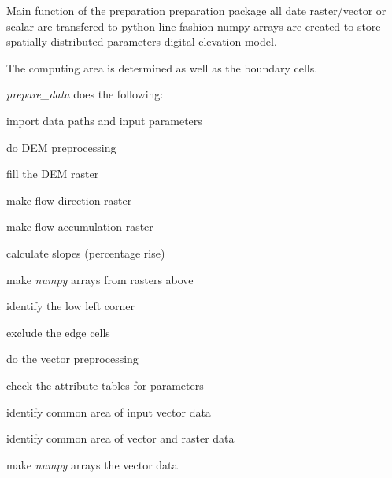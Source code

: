 Main function of the preparation preparation package all date raster/vector or scalar are transfered to python line fashion numpy arrays are created to store spatially distributed parameters digital elevation model. 

The computing area is determined as well as the boundary cells.

{\itshape prepare\-\_\-data} does the following\-:
\begin{DoxyItemize}
\item import data paths and input parameters
\item do D\-E\-M preprocessing
\begin{DoxyItemize}
\item fill the D\-E\-M raster
\item make flow direction raster
\item make flow accumulation raster
\item calculate slopes (percentage rise)
\item make {\itshape numpy} arrays from rasters above
\end{DoxyItemize}
\item identify the low left corner
\item exclude the edge cells
\item do the vector preprocessing
\begin{DoxyItemize}
\item check the attribute tables for parameters
\item identify common area of input vector data
\item identify common area of vector and raster data
\item make {\itshape numpy} arrays the vector data
\end{DoxyItemize}
\end{DoxyItemize}


